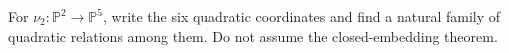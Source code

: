 \begin{problem}\label{chal:vi36-03}
For \(\nu_2:\mathbb P^2\to\mathbb P^5\), write the six quadratic coordinates and find a natural family of quadratic relations among them.  Do not assume the closed-embedding theorem.
\end{problem}
